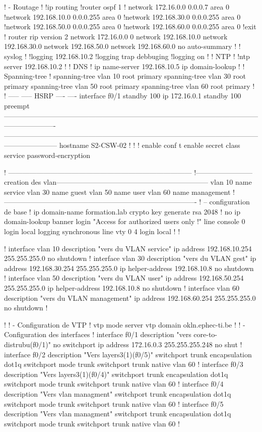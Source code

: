 \documentclass{article}
\begin{document}
\begin{verbatimtab}[4]
! - Routage
!
!ip routing
!router ospf 1
! network 172.16.0.0 0.0.0.7 area 0
!network 192.168.10.0 0.0.0.255 area 0
!network 192.168.30.0 0.0.0.255 area 0
!network 192.168.50.0 0.0.0.255 area 0 
!network 192.168.60.0 0.0.0.255 area 0 
!exit      
! 
router rip
version 2 
network 172.16.0.0 0
network 192.168.10.0 
network 192.168.30.0 
network 192.168.50.0  
network 192.168.60.0 
no auto-summary
!
! syslog
!
!logging 192.168.10.2
!logging trap debbuging
!logging on
!
! NTP
!
!ntp server 192.168.10.2
! 
! DNS
!
ip name-server 192.168.10.5
ip domain-lookup
!
! Spanning-tree
!
spanning-tree vlan 10 root primary  
spanning-tree vlan 30 root primary 
spanning-tree vlan 50 root primary
spanning-tree vlan 60 root primary  
!
!
-----
-----
HSRP
----
----
interface f0/1
standby 100 ip 172.16.0.1
standby 100 preempt
----------------------------------------------------------------------------------------------------------------------------------
-----------------------------------------------------------------------------------------------------------------------------------
hostname S2-CSW-02
!
!
!
enable
conf t
enable secret class 
service password-encryption

! ------------------------------------------------------------------------------
!------------------------creation des vlan-----------------------------------------------------------------
vlan 10 name service
vlan 30 name guest
vlan 50 name user
vlan 60 name management
!----------------------------------------------------------------------------------
! – configuration de base 
!
ip domain-name formation.lab
crypto key generate rsa
2048
!
no ip domain-lookup
banner login "Access for authorized users only !"
line console 0
  login local
  logging synchronous
line vty 0 4
  login local
!
!

!
interface vlan 10
  description "vers du VLAN service"
  ip address 192.168.10.254 255.255.255.0
  no shutdown
!      
interface vlan 30
  description "vers du VLAN gest"
  ip address 192.168.30.254 255.255.255.0
  ip helper-address 192.168.10.8
  no shutdown
!
interface vlan 50
  description "vers du VLAN user"
  ip address 192.168.50.254 255.255.255.0
  ip helper-address 192.168.10.8
  no shutdown
!
interface vlan 60
  description "vers du VLAN management"
  ip address 192.168.60.254 255.255.255.0
  no shutdown
!

!
! - Configuration de VTP
!
vtp mode server
vtp domain okln.ephec-ti.be 
!
! - Configuration des interfaces
!       
interface f0/1
  description "vers core-to-distrubu(f0/1)"
  no switchport
  ip address 172.16.0.3 255.255.255.248
  no shut
!  
interface f0/2
  description "Vers layers3(1)(f0/5)"
  switchport trunk encapsulation dot1q
  switchport mode trunk
  switchport trunk native vlan 60
!
interface f0/3
  description "Vers layers3(1)(f0/4)"
  switchport trunk encapsulation dot1q
  switchport mode trunk
  switchport trunk native vlan 60
!
interface f0/4
  description "Vers vlan managment"
  switchport trunk encapsulation dot1q
  switchport mode trunk
  switchport trunk native vlan 60 
!
interface f0/5
  description "Vers vlan managment"
  switchport trunk encapsulation dot1q
  switchport mode trunk
  switchport trunk native vlan 60 
!
 

\end{verbatimtab}
\end{document}

